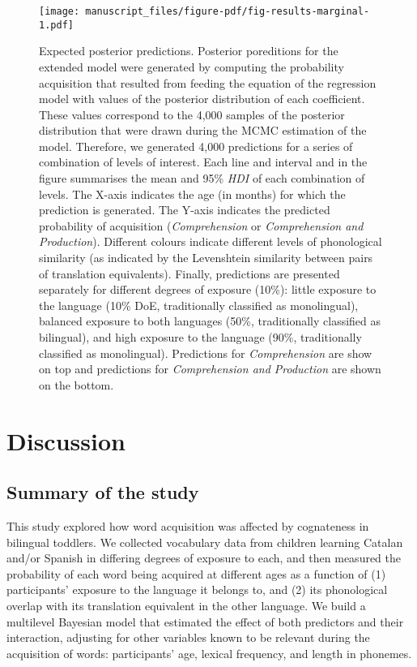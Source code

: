 \documentclass[
  letterpaper,
  DIV=11,
  numbers=noendperiod]{scrartcl}
\begin{document}
\begin{figure}

{\centering \texttt{[image: manuscript\_files/figure-pdf/fig-results-marginal-1.pdf]}

}

\caption{\label{fig-results-marginal}Expected posterior predictions.
Posterior poreditions for the extended model were generated by computing
the probability acquisition that resulted from feeding the equation of
the regression model with values of the posterior distribution of each
coefficient. These values correspond to the 4,000 samples of the
posterior distribution that were drawn during the MCMC estimation of the
model. Therefore, we generated 4,000 predictions for a series of
combination of levels of interest. Each line and interval and in the
figure summarises the mean and 95\% \emph{HDI} of each combination of
levels. The X-axis indicates the age (in months) for which the
prediction is generated. The Y-axis indicates the predicted probability
of acquisition (\emph{Comprehension} or \emph{Comprehension and
Production}). Different colours indicate different levels of
phonological similarity (as indicated by the Levenshtein similarity
between pairs of translation equivalents). Finally, predictions are
presented separately for different degrees of exposure (10\%): little
exposure to the language (10\% DoE, traditionally classified as
monolingual), balanced exposure to both languages (50\%, traditionally
classified as bilingual), and high exposure to the language (90\%,
traditionally classified as monolingual). Predictions for
\emph{Comprehension} are show on top and predictions for
\emph{Comprehension and Production} are shown on the bottom.}

\end{figure}

\hypertarget{discussion}{%
\section{Discussion}\label{discussion}}

\hypertarget{summary-of-the-study}{%
\subsection{Summary of the study}\label{summary-of-the-study}}

This study explored how word acquisition was affected by cognateness in
bilingual toddlers. We collected vocabulary data from children learning
Catalan and/or Spanish in differing degrees of exposure to each, and
then measured the probability of each word being acquired at different
ages as a function of (1) participants' exposure to the language it
belongs to, and (2) its phonological overlap with its translation
equivalent in the other language. We build a multilevel Bayesian model
that estimated the effect of both predictors and their interaction,
adjusting for other variables known to be relevant during the
acquisition of words: participants' age, lexical frequency, and length
in phonemes.
\end{document}
